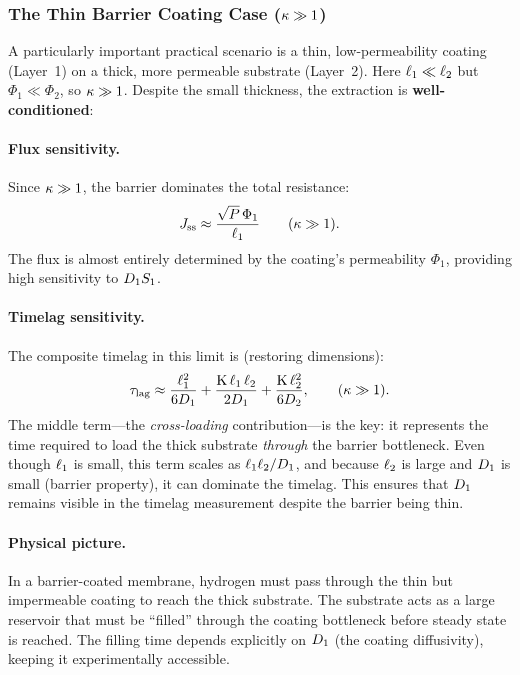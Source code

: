 \subsubsection{The Thin Barrier Coating Case ($\kappa \gg 1$)}
\label{sec:barrier-coating}

A particularly important practical scenario is a thin, low-permeability coating
(Layer~1) on a thick, more permeable substrate (Layer~2).  Here
$\ell_{1} \ll \ell_{2}$ but $\Phi_1 \ll \Phi_2$, so $\kappa \gg 1$.
Despite the small thickness, the extraction is \textbf{well-conditioned}:

\paragraph{Flux sensitivity.}
Since $\kappa \gg 1$, the barrier dominates the total resistance:
\begin{equation}
  J_{\mathrm{ss}} \approx \frac{\sqrt{P}\,\Phi_1}{\ell_{1}}
  \qquad (\kappa \gg 1).
\end{equation}
The flux is almost entirely determined by the coating's permeability $\Phi_1$,
providing high sensitivity to $D_{1}S_{1}$.

\paragraph{Timelag sensitivity.}
The composite timelag in this limit is (restoring dimensions):
\begin{equation}
  \label{eq:tlag-barrier-limit}
  \tau_{\mathrm{lag}} \approx \frac{\ell_{1}^2}{6D_{1}}
  + \frac{\mathrm{K}\,\ell_{1}\,\ell_{2}}{2D_{1}}
  + \frac{\mathrm{K}\,\ell_{2}^2}{6D_{2}},
  \qquad (\kappa \gg 1).
\end{equation}
The middle term---the \emph{cross-loading} contribution---is the key: it
represents the time required to load the thick substrate \emph{through} the
barrier bottleneck.  Even though $\ell_{1}$ is small, this term scales as
$\ell_{1}\ell_{2}/D_{1}$, and because $\ell_{2}$ is large and $D_{1}$ is small
(barrier property), it can dominate the timelag.
This ensures that $D_{1}$ remains visible in the timelag measurement
despite the barrier being thin.

\paragraph{Physical picture.}
In a barrier-coated membrane, hydrogen must pass through the thin but
impermeable coating to reach the thick substrate.  The substrate acts as a
large reservoir that must be ``filled'' through the coating bottleneck before
steady state is reached.  The filling time depends explicitly on $D_{1}$
(the coating diffusivity), keeping it experimentally accessible.

